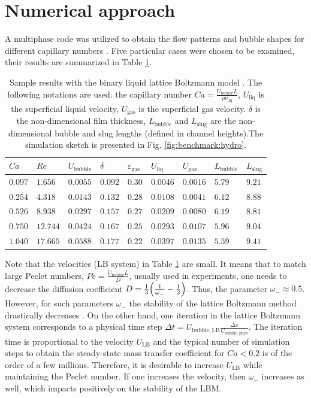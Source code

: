 \documentclass{article}
\newcommand{\lbubble}{L_{\mathrm{bubble}}}
\newcommand{\lslug}{L_{\mathrm{slug}}}
\newcommand{\ububble}{U_{\mathrm{bubble}}}
\newcommand{\uliq}{U_{\mathrm{liq}}}
\newcommand{\ugas}{U_{\mathrm{gas}}}
\newcommand{\omegaminus}{\omega_{-}}
\newcommand{\holdup}{\varepsilon_{\mathrm{gas}}}
\begin{document}
\section{Numerical approach}
\label{sec:numerics}
A multiphase code was utilized to obtain the flow patterns and bubble shapes for different capillary numbers
\cite{kuzmin-binary2d}. Five particular cases were chosen to be examined, their results are summarized
in Table \ref{table:capillary:cases}. 
\begin{table}[htb!]
\begin{tabularx}{\textwidth}{|X|X|X|X|X|X|X|X|X|}
\hline
$Ca$    &$Re$     &$\ububble$ &$\delta$&$\holdup$
&$\uliq$&$\ugas$&$\lbubble$&$\lslug$\\
\hline
$0.097$ &$1.656$  &$0.0055$ &$0.092$ &$0.30$ &$0.0046$&$0.0016$&$5.79$&$9.21$\\ 
$0.254$ &$4.318$  &$0.0143$ &$0.132$ &$0.28$ &$0.0108$&$0.0041$&$6.12$&$8.88$\\ 
$0.526$ &$8.938$  &$0.0297$ &$0.157$ &$0.27$ &$0.0209$&$0.0080$&$6.19$&$8.81$\\
$0.750$ &$12.744$ &$0.0424$ &$0.167$ &$0.25$ &$0.0293$&$0.0107$&$5.96$&$9.04$\\
$1.040$ &$17.665$ &$0.0588$ &$0.177$ &$0.22$ &$0.0397$&$0.0135$&$5.59$&$9.41$\\
\hline
\end{tabularx}
\caption{Sample results with the binary liquid lattice Boltzmann model \cite{kuzmin-binary2d}. The
following notations are used: the capillary number $Ca=\frac{\ububble L}{\rho \nu_{\mathrm{liq}}}$, $\uliq$ is the superficial liquid velocity, $\ugas$ is the
superficial gas velocity. $\delta$ is the
non-dimensional film thickness, $\lbubble$ and $\lslug$ are the non-dimensional bubble and slug lengths (defined in channel heights).The simulation sketch is presented in Fig.
\ref{fig:benchmark:hydro}. \label{table:capillary:cases}}
\end{table}
Note that the velocities (LB system) in Table \ref{table:capillary:cases} are small. It means that to
match large Peclet numbers, $Pe=\frac{\ububble L}{D}$, usually used in experiments, one needs to decrease the diffusion coefficient
$D=\frac{1}{3}\Bigl(\frac{1}{\omegaminus}-\frac{1}{2}\Bigr)$. Thus, the parameter $\omegaminus\approx 0.5$. However, for such parameters
$\omegaminus$ the stability of the lattice Boltzmann method drastically decreases
\cite{kuzmin-d1q3}. On the other hand, one iteration in the lattice Boltzmann system corresponds
to a physical time step  $\Delta t=U_{\mathrm{bubble,LB}} \frac{\Delta
x}{U_{\mathrm{bubble,phys}}}$. The iteration time is proportional to the velocity $U_{\mathrm{LB}}$
and the typical number of simulation steps to obtain the steady-state mass transfer coefficient for
$Ca<0.2$ is of the order of a few millions. Therefore, it is desirable to increase    $U_{\mathrm{LB}}$
while maintaining the Peclet number. If one increases the velocity, then
$\omegaminus$ increases as well, which impacts positively on the stability of the LBM.
 
\end{document}
